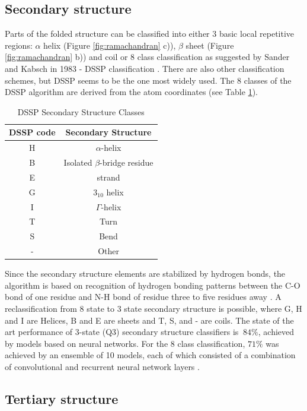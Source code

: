 \subsection{Secondary structure}

Parts of the folded structure can be classified into either 3 basic local repetitive regions: $\alpha$ helix (Figure \ref{fig:ramachandran} c)), $\beta$ sheet (Figure \ref{fig:ramachandran} b)) and coil or 8 class classification as suggested by Sander and Kabsch in 1983 - DSSP classification \cite{dssp2}. 
There are also other classification schemes, but DSSP seems to be the one most widely used. 
The 8 classes of the DSSP algorithm are derived from the atom coordinates (see Table \ref{tab:dssp0}).

\begin{table}[ht]
    \centering
    \begin{tabular}{c|c}
        DSSP code & Secondary Structure\\ 
        \hline
        H     & $\alpha$-helix \\
        B     & Isolated $\beta$-bridge residue \\
        E     & strand \\
        G     & $3_{10}$ helix \\
        I     & $\Gamma$-helix \\
        T     & Turn \\
        S     & Bend \\
        -     & Other 
    \end{tabular}
    \caption{DSSP Secondary Structure Classes}
    \label{tab:dssp0}
\end{table}

Since the secondary structure elements are stabilized by hydrogen bonds, the algorithm is based on recognition of hydrogen bonding patterns between the C-O bond of one residue and N-H bond of residue three to five residues away \cite{dssp2}. 
A reclassification from 8 state to 3 state secondary structure is possible, where G, H and I are Helices, B and E are sheets and T, S, and - are coils. 
The state of the art performance of 3-state (Q3) secondary structure classifiers is $~84\%$, achieved by models based on neural networks. 
For the 8 class classification, $71\%$ was achieved by an ensemble of 10 models, each of which consisted of a combination of convolutional and recurrent neural network layers \cite{dssp_sec}. 

\subsection{Tertiary structure}

